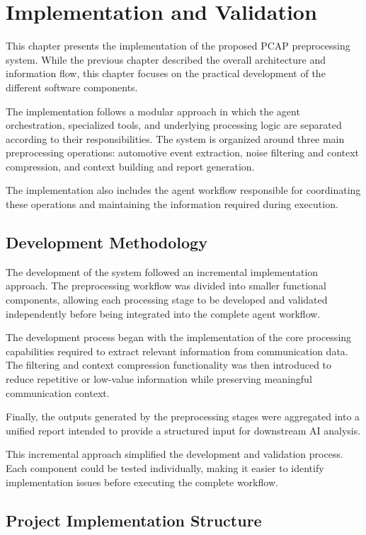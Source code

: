 \chapter{Implementation and Validation}

This chapter presents the implementation of the proposed PCAP preprocessing system. While the previous chapter described the overall architecture and information flow, this chapter focuses on the practical development of the different software components.

The implementation follows a modular approach in which the agent orchestration, specialized tools, and underlying processing logic are separated according to their responsibilities. The system is organized around three main preprocessing operations: automotive event extraction, noise filtering and context compression, and context building and report generation.

The implementation also includes the agent workflow responsible for coordinating these operations and maintaining the information required during execution.

\section{Development Methodology}

The development of the system followed an incremental implementation approach. The preprocessing workflow was divided into smaller functional components, allowing each processing stage to be developed and validated independently before being integrated into the complete agent workflow.

The development process began with the implementation of the core processing capabilities required to extract relevant information from communication data. The filtering and context compression functionality was then introduced to reduce repetitive or low-value information while preserving meaningful communication context.

Finally, the outputs generated by the preprocessing stages were aggregated into a unified report intended to provide a structured input for downstream AI analysis.

This incremental approach simplified the development and validation process. Each component could be tested individually, making it easier to identify implementation issues before executing the complete workflow.

\section{Project Implementation Structure}

